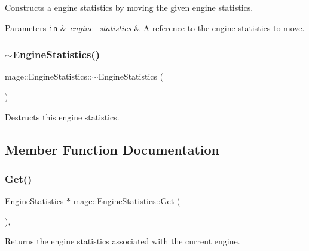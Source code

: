 Constructs a engine statistics by moving the given engine statistics.


\begin{DoxyParams}[1]{Parameters}
\mbox{\tt in}  & {\em engine\+\_\+statistics} & A reference to the engine statistics to move. \\
\hline
\end{DoxyParams}
\hypertarget{classmage_1_1_engine_statistics_a471f643061b881ae69cc807b34c48127}{}\label{classmage_1_1_engine_statistics_a471f643061b881ae69cc807b34c48127} 
\subsubsection{\texorpdfstring{$\sim$\+Engine\+Statistics()}{~EngineStatistics()}}
{\footnotesize\ttfamily mage\+::\+Engine\+Statistics\+::$\sim$\+Engine\+Statistics (\begin{DoxyParamCaption}{ }\end{DoxyParamCaption})\hspace{0.3cm}{\ttfamily [default]}}

Destructs this engine statistics. 

\subsection{Member Function Documentation}
\hypertarget{classmage_1_1_engine_statistics_a7eb0d3a988676f71eea8e9f26ab07f42}{}\label{classmage_1_1_engine_statistics_a7eb0d3a988676f71eea8e9f26ab07f42} 
\subsubsection{\texorpdfstring{Get()}{Get()}}
{\footnotesize\ttfamily \hyperlink{classmage_1_1_engine_statistics}{Engine\+Statistics} $\ast$ mage\+::\+Engine\+Statistics\+::\+Get (\begin{DoxyParamCaption}{ }\end{DoxyParamCaption})\hspace{0.3cm}{\ttfamily [static]}, {\ttfamily [noexcept]}}

Returns the engine statistics associated with the current engine.

